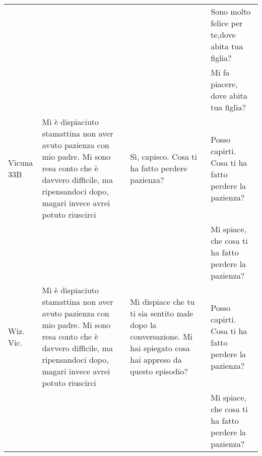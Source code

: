 \begin{table}[!htbp]
\begin{tabularx}{\linewidth}{l|X|X|X}
    &&&Sono molto felice per te,dove abita tua figlia?\\[2em]
    &&&Mi fa piacere, dove abita tua figlia?\\
        \midrule
Vicuna 33B & Mi è dispiaciuto stamattina non aver avuto pazienza con mio padre. Mi sono resa conto che è davvero difficile, ma ripensandoci dopo, magari invece avrei potuto riuscirci &  Sì, capisco. Cosa ti ha fatto perdere pazienza? & Posso capirti. Cosa ti ha fatto perdere la pazienza?\\[2em]
    &&&Mi spiace, che cosa ti ha fatto perdere la pazienza? \\
    \midrule
    Wiz. Vic. & Mi è dispiaciuto stamattina non aver avuto pazienza con mio padre. Mi sono resa conto che è davvero difficile, ma ripensandoci dopo, magari invece avrei potuto riuscirci & Mi dispiace che tu ti sia sentito male dopo la conversazione. Mi hai spiegato cosa hai appreso da questo episodio? & Posso capirti. Cosa ti ha fatto perdere la pazienza?\\[2em]
    &&&Mi spiace, che cosa ti ha fatto perdere la pazienza? \\
    \bottomrule
    \end{tabularx}
\end{table}
